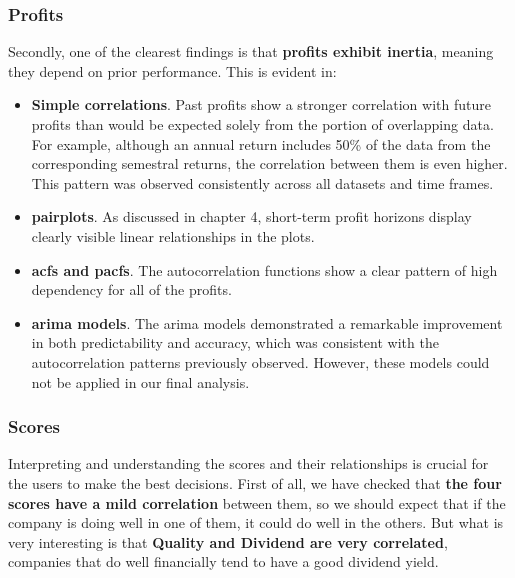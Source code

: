 \documentclass[11pt,english,a4paper,hidelinks]{book}
\begin{document}
\subsubsection{Profits}

\noindent Secondly, one of the clearest findings is that \textbf{profits exhibit inertia}, meaning they depend on prior performance. This is evident in:
\begin{itemize}
    \item \textbf{Simple correlations}. Past profits show a stronger correlation with future profits than would be expected solely from the portion of overlapping data. For example, although an annual return includes 50\% of the data from the corresponding semestral returns, the correlation between them is even higher. This pattern was observed consistently across all datasets and time frames.
    \item \textbf{\acrshort{pairplot}s}. As discussed in chapter 4, short-term profit horizons display clearly visible linear relationships in the plots.
    \item \textbf{\acrshort{acf}s and \acrshort{pacf}s}. The autocorrelation functions show a clear pattern of high dependency for all of the profits.
    \item \textbf{\acrshort{arima} models}. The \acrshort{arima} models demonstrated a remarkable improvement in both predictability and accuracy, which was consistent with the autocorrelation patterns previously observed. However, these models could not be applied in our final analysis.
\end{itemize}




\subsubsection{Scores}

\noindent Interpreting and understanding the scores and their relationships is crucial for the users to make the best decisions. First of all, we have checked that \textbf{the four scores have a mild correlation} between them, so we should expect that if the company is doing well in one of them, it could do well in the others. But what is very interesting is that \textbf{Quality and Dividend are very correlated}, companies that do well financially tend to have a good dividend yield.

\vspace{0.5cm}
\end{document}
